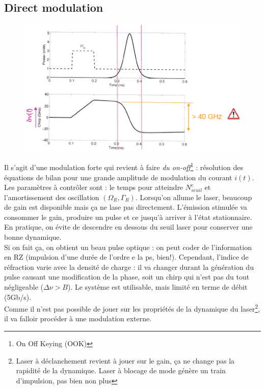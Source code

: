 \subsection{Direct modulation}
\begin{figure}
	\vspace{-5mm}
	\includegraphics[scale=0.6]{ch4/image27}
	\end{figure}
Il s'agit d'une modulation forte qui revient à faire \textit{du on-off}\footnote{On Off Keying (OOK)} :
résolution des équations de bilan pour une grande amplitude de modulation du courant $i(t)$. Les
paramètres à contrôler sont : le temps pour atteindre $N^e_{seuil}$ et l'amortissement des oscillation 
$(\Omega_R,\Gamma_R)$. Lorsqu'on allume le laser, beaucoup de gain est disponible mais ça ne lase pas
directement. L'émission stimulée va consommer le gain, produire un pulse et ce jusqu'à arriver à l'état
stationnaire. En  pratique, on évite de descendre en dessous du seuil laser pour conserver une bonne 
dynamique.\\

Si on fait ça, on obtient un beau pulse optique : on peut coder de l'information en RZ (impulsion
d'une durée de l'ordre e la ps, bien!). Cependant, l'indice de réfraction varie avec la densité de 
charge : il va changer durant la génération du pulse causant une modification de la phase, soit un
chirp qui n'est pas du tout négligeable ($\Delta \nu > B$). Le système est utilisable, mais limité
en terme de débit (5Gb/s).\\

Comme il n'est pas possible de jouer sur les propriétés de la dynamique du laser\footnote{Laser à
déclanchement revient à jouer sur le gain, ça ne change pas la rapidité de la dynamique. Laser à 
blocage de mode génère un train d'impulsion, pas bien non plus}, il va falloir procéder à une 
modulation externe.

